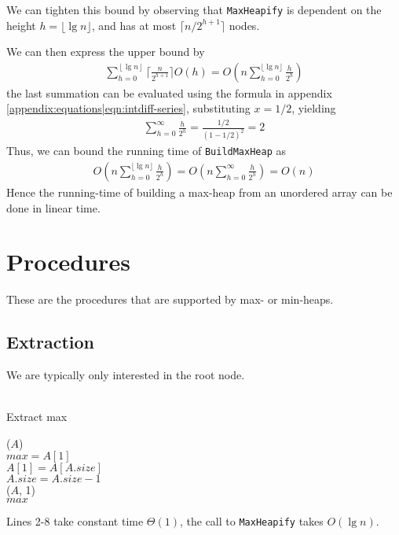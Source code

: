 We can tighten this bound by observing that \texttt{MaxHeapify} is dependent
on the height $h = \lfloor \lg n \rfloor$, and has at most $\lceil n/2^{h+1}
\rceil$ nodes.

We can then express the upper bound by
\begin{align}
	\sum_{h=0}^{\left\lfloor \lg n \right\rfloor}
	\lceil \frac {n}{2^{h+1}} \rceil O(h) =
	O \left( n \sum_{h=0}^{\lfloor \lg n \rfloor} \frac{h}{2^h} \right)
\end{align}
the last summation can be evaluated using the formula in appendix
\ref{appendix:equations|eqn:intdiff-series}, substituting $x = 1/2$, yielding
\begin{align}
	\sum_{h=0}^{\infty} \frac{h}{2^h} = \frac{1/2}{(1 - 1/2)^2} = 2
\end{align}
Thus, we can bound the running time of \texttt{BuildMaxHeap} as
\begin{align}
	O \left( n \sum_{h=0}^{\lfloor \lg n \rfloor} \frac{h}{2^h} \right) =
	O \left( n \sum_{h=0}^{\infty} \frac{h}{2^h} \right) = O(n)
\end{align}
Hence the running-time of building a max-heap from an unordered array can be
done in linear time.

\newpage

\section{Procedures}
\label{ch:heaps|sec:procedures}
These are the procedures that are supported by max- or min-heaps.

\subsection{Extraction}
\label{ch:heaps|sec:procedures|sub:extraction}
We are typically only interested in the root node.\\\\
\begin{algorithm}[H]
	\caption{Extract max}
	\label{alg:heap-extract-max}





	\BlankLine
	\ExtractMax($A$) \\
	\Begin
	{
		$max = A[1]$ \\
		$A[1] = A[A.size]$ \\
		$A.size = A.size - 1$ \\
		\MaxHeapify($A$, 1) \\
		\Return $max$
	}
\end{algorithm}
Lines 2-8 take constant time $\Theta(1)$, the call to \texttt{MaxHeapify}
takes $O(\lg n)$.

